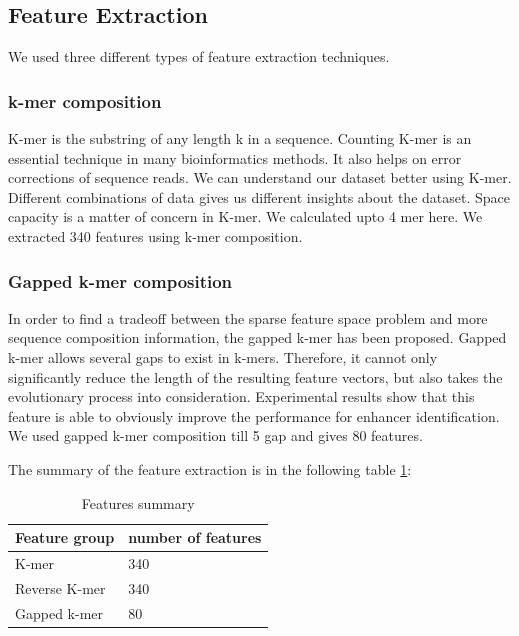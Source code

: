 \documentclass[letterpaper, 10 pt, conference]{ieeeconf}  %
\begin{document}
\subsection{Feature Extraction}
We used three different types of feature extraction techniques.
\subsubsection{ k-mer composition}
 K-mer is the substring of any length k in a sequence.  Counting K-mer is an essential technique in many bioinformatics methods. It also helps on error corrections of sequence reads. We can understand our dataset better using K-mer. Different combinations of data gives us different insights about the dataset. Space capacity is a matter of concern in K-mer. We calculated upto 4 mer here. We extracted 340 features using k-mer composition.
\\

\subsubsection{Gapped k-mer composition}
In order to find a tradeoff between the sparse feature space problem and more sequence composition information, the gapped k-mer has been proposed. Gapped k-mer allows several gaps to exist in k-mers. Therefore, it cannot only significantly reduce the length of the resulting feature vectors, but also takes the evolutionary process into consideration. Experimental results show that this feature is able to obviously improve the performance for enhancer identification. We used gapped k-mer composition till 5 gap and gives 80 features.

The summary of the feature extraction is in the following table \ref{table_1}:
\\


\begin{table}[ht]
\caption{Features summary}
\label{table_1}
\begin{center}
\begin{tabular}{|p{3cm}|p{3cm}|}
\hline
Feature group & number of features\\
\hline
K-mer  & 340\\
\hline
Reverse K-mer  & 340\\
\hline
Gapped k-mer  & 80\\
\hline
\end{tabular}
\end{center}
\end{table}
\end{document}
